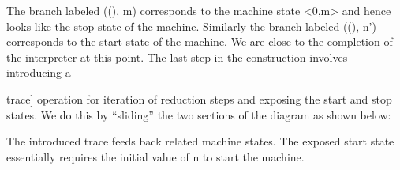 \documentclass{llncs}
\begin{document}
The branch labeled {{((), m)}} corresponds to the machine state {{<0,m>}} and
hence looks like the stop state of the machine. Similarly the branch labeled
{{((), n')}} corresponds to the start state of the machine. We are close to
the completion of the interpreter at this point. The last step in the
construction involves introducing a {{trace}] operation for iteration of
reduction steps and exposing the start and stop states. We do this by
``sliding'' the two sections of the diagram as shown below:

\vspace{-20px}
\begin{multicols}{2}
\begin{center}
\end{center}
\columnbreak
\begin{center}
\end{center}  
\end{multicols}

The introduced {{trace}} feeds back related machine states. The
exposed start state essentially requires the initial value of {{n}} to
start the machine. 

\begin{center}
\end{center}

}
\end{document}
